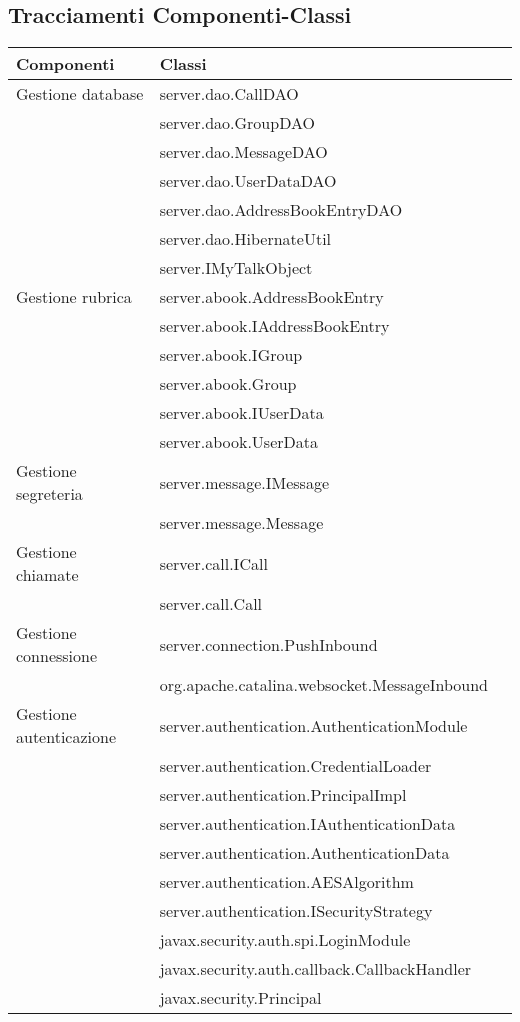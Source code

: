 \subsection{Tracciamenti Componenti-Classi}\label{sec:tracCompClass}

\begin{center}
\begin{longtable}{lp{}l}
\toprule Componenti & Classi\\
\midrule
Gestione database & server.dao.CallDAO\\
& server.dao.GroupDAO\\
& server.dao.MessageDAO\\
& server.dao.UserDataDAO\\
& server.dao.AddressBookEntryDAO\\
& server.dao.HibernateUtil\\
& server.IMyTalkObject\\

Gestione rubrica & server.abook.AddressBookEntry\\
& server.abook.IAddressBookEntry\\
& server.abook.IGroup\\
& server.abook.Group\\
& server.abook.IUserData\\
& server.abook.UserData\\

Gestione segreteria & server.message.IMessage\\
& server.message.Message\\

Gestione chiamate & server.call.ICall\\
& server.call.Call\\

Gestione connessione & server.connection.PushInbound\\
& org.apache.catalina.websocket.MessageInbound\\

Gestione autenticazione & server.authentication.AuthenticationModule\\
& server.authentication.CredentialLoader\\
& server.authentication.PrincipalImpl\\
& server.authentication.IAuthenticationData\\
& server.authentication.AuthenticationData\\
& server.authentication.AESAlgorithm\\
& server.authentication.ISecurityStrategy\\
& javax.security.auth.spi.LoginModule\\
& javax.security.auth.callback.CallbackHandler\\
& javax.security.Principal\\


\end{longtable}
\end{center}
